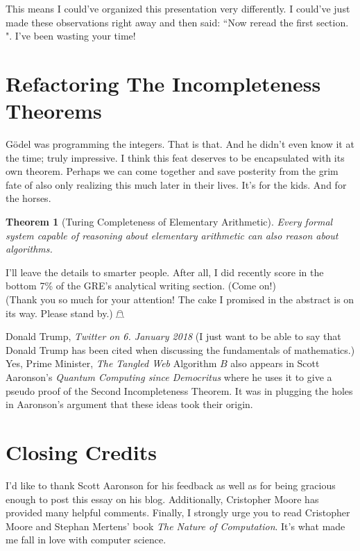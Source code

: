 \documentclass{article}
\theoremstyle{theorem}
\newtheorem{theorem}{Theorem}
\begin{document}
This means I could've organized this presentation very differently. I could've just made these observations right away and then said: ``Now reread the first section. \scalebox{0.9}{$\square$}". I've been wasting your time!

\section{Refactoring The Incompleteness Theorems}

Gödel was programming the integers. That is that. And he didn't even know it at the time; truly impressive. I think this feat deserves to be encapsulated with its own theorem. Perhaps we can come together and save posterity from the grim fate of also only realizing this much later in their lives. It's for the kids. And for the horses.

\begin{theorem}[Turing Completeness of Elementary Arithmetic]
Every formal system capable of reasoning about elementary arithmetic can also reason about algorithms.
\end{theorem}

I'll leave the details to smarter people. After all, I did recently score in the bottom 7\% of the GRE's analytical writing section. (Come on!)\\[2em]
\footnotesize{(Thank you so much for your attention! The cake I promised in the abstract is on its way. Please stand by.) $\mathghost$}

\begin{thebibliography}{1}
Donald Trump, \textit{Twitter on 6. January 2018} (I just want to be able to say that Donald Trump has been cited when discussing the fundamentals of mathematics.)
Yes, Prime Minister, \textit{The Tangled Web}
 Algorithm $B$ also appears in Scott Aaronson's \textit{Quantum Computing since Democritus} where he uses it to give a pseudo proof of the Second Incompleteness Theorem. It was in plugging the holes in Aaronson's argument that these ideas took their origin.
\end{thebibliography}

\section*{Closing Credits}

I'd like to thank Scott Aaronson for his feedback as well as for being gracious enough to post this essay on his blog. Additionally, Cristopher Moore has provided many helpful comments. Finally, I strongly urge you to read Cristopher Moore and Stephan Mertens' book \textit{The Nature of Computation}. It's what made me fall in love with computer science.


\vfill\eject
\end{document}
